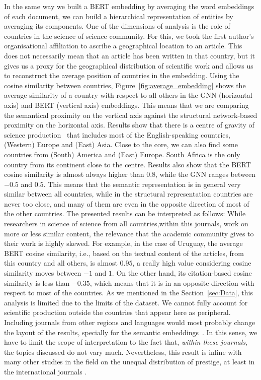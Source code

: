 \documentclass[smallextended]{svjour3}
\begin{document}
	In the same way we built a BERT embedding by averaging the word embeddings of each document, we can build a hierarchical representation of entities by averaging its components. One of the dimensions of analysis is the role of countries in the science of science community. For this, we took the first author's organisational affiliation to ascribe a geographical location to an article. This does not necessarily mean that an article has been written in that country, but it gives us a proxy for the geographical distribution of scientific work and allows us to reconstruct the average position of countries in the embedding. Using the cosine similarity between countries, Figure~\ref{fig:average_embedding} shows the average similarity of a country with respect to all others in the GNN (horizontal axis) and BERT (vertical axis) embeddings. This means that we are comparing the semantical proximity on the vertical axis against the structural network-based proximity on the horizontal axis. Results show that there is a centre of gravity of science production~\parencite{Zhang2015} that includes most of the English-speaking countries, (Western) Europe and (East) Asia. Close to the core, we can also find some countries from (South) America and (East) Europe. South Africa is the only country from its continent close to the centre. Results also show that the BERT cosine similarity is almost always higher than 0.8, while the GNN ranges between $-0.5$ and $0.5$. This means that the semantic representation is in general very similar between all countries, while in the structural representation countries are never too close, and many of them are even in the opposite direction of most of the other countries. The presented results can be interpreted as follows: While researchers in science of science from all countries,within this journals, work on more or less similar content, the relevance that the academic community gives to their work is highly skewed. For example, in the case of Uruguay, the average BERT cosine similarity, i.e., based on the textual content of the articles, from this country and all others, is almost $0.95$, a really high value considering cosine similarity moves between $-1$ and $1$. On the other hand, its citation-based cosine similarity is less than $-0.35$, which means that it is in an opposite direction with respect to most of the countries. As we mentioned in the Section~\ref{sec:Data}, this analysis is limited due to the limits of the dataset. We cannot fully account for scientific production outside the countries that appear here as peripheral. Including journals from other regions and languages would most probably change the layout of the results, specially for the semantic embeddings~\parencite{beigel_introduction_2014}. In this sense, we have to limit the scope of interpretation to the fact that, \textit{within these journals}, the topics discussed do not vary much. Nevertheless, this result is inline with many other studies in the field on the unequal distribution of prestige, at least in the international journals \parencite{demeter_world-systemic_2020, king_power_2011,bonitz_characteristics_1997, merton_sociology_1974}. 
	
\end{document}
